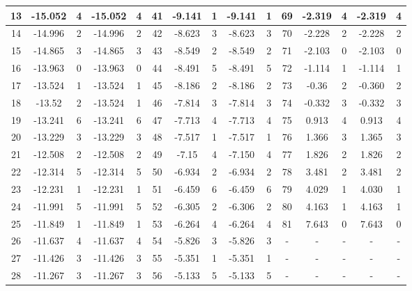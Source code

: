 \begin{table}[h]
\begin{tabular}{|c|c|c|c|c||c|c|c|c|c||c|c|c|c|c|}
\hline 13  & -15.052 &       4 & -15.052 & 4 & 41  &  -9.141 &       1 & -9.141 & 1 & 69  &  -2.319 &       4 & -2.319 & 4 \\
\hline 14  & -14.996 &       2 & -14.996 & 2 & 42  &  -8.623 &       3 & -8.623 & 3 & 70  &  -2.228 &       2 & -2.228 & 2 \\
\hline 15  & -14.865 &       3 & -14.865 & 3 & 43  &  -8.549 &       2 & -8.549 & 2 & 71  &  -2.103 &       0 & -2.103 & 0 \\
\hline 16  & -13.963 &       0 & -13.963 & 0 & 44  &  -8.491 &       5 & -8.491 & 5 & 72  &  -1.114 &       1 & -1.114 & 1 \\
\hline 17  & -13.524 &       1 & -13.524 & 1 & 45  &  -8.186 &       2 & -8.186 & 2 & 73  &   -0.36 &       2 & -0.360 & 2 \\
\hline 18  &  -13.52 &       2 & -13.524 & 1 & 46  &  -7.814 &       3 & -7.814 & 3 & 74  &  -0.332 &       3 & -0.332 & 3 \\
\hline 19  & -13.241 &       6 & -13.241 & 6 & 47  &  -7.713 &       4 & -7.713 & 4 & 75  &   0.913 &       4 & 0.913 & 4 \\
\hline 20  & -13.229 &       3 & -13.229 & 3 & 48  &  -7.517 &       1 & -7.517 & 1 & 76  &   1.366 &       3 & 1.365 & 3 \\
\hline 21  & -12.508 &       2 & -12.508 & 2 & 49  &   -7.15 &       4 & -7.150 & 4 & 77  &   1.826 &       2 & 1.826 & 2 \\
\hline 22  & -12.314 &       5 & -12.314 & 5 & 50  &  -6.934 &       2 & -6.934 & 2 & 78  &   3.481 &       2 & 3.481 & 2 \\
\hline 23  & -12.231 &       1 & -12.231 & 1 & 51  &  -6.459 &       6 & -6.459 & 6 & 79  &   4.029 &       1 & 4.030 & 1 \\
\hline 24  & -11.991 &       5 & -11.991 & 5 & 52  &  -6.305 &       2 & -6.306 & 2 & 80  &   4.163 &       1 & 4.163 & 1 \\
\hline 25  & -11.849 &       1 & -11.849 & 1 & 53  &  -6.264 &       4 & -6.264 & 4 & 81  &   7.643 &       0 & 7.643 & 0 \\
\hline 26  & -11.637 &       4 & -11.637 & 4 & 54  &  -5.826 &       3 & -5.826 & 3 &  -  &  -  &  -  &  -  &  -  \\
\hline 27  & -11.426 &       3 & -11.426 & 3 & 55  &  -5.351 &       1 & -5.351 & 1 &  -  &  -  &  -  &  -  &  -  \\
\hline 28  & -11.267 &       3 & -11.267 & 3 & 56  &  -5.133 &       5 & -5.133 & 5 &  -  &  -  &  -  &  -  &  -  \\
\hline
\end{tabular}
\end{table}


